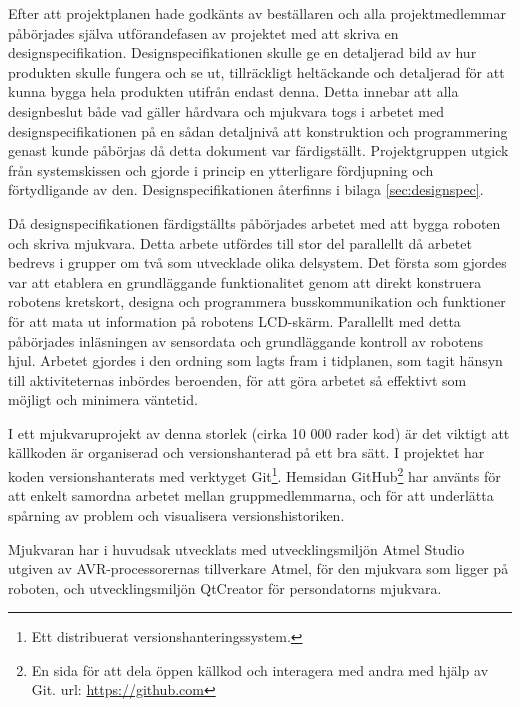 Efter att projektplanen hade godkänts av beställaren och alla projektmedlemmar påbörjades själva utförandefasen av projektet med att skriva en designspecifikation. Designspecifikationen skulle ge en detaljerad bild av hur produkten skulle fungera och se ut, tillräckligt heltäckande och detaljerad för att kunna bygga hela produkten utifrån endast denna. Detta innebar att alla designbeslut både vad gäller hårdvara och mjukvara togs i arbetet med designspecifikationen på en sådan detaljnivå att konstruktion och programmering genast kunde påbörjas då detta dokument var färdigställt. Projektgruppen utgick från systemskissen och gjorde i princip en ytterligare fördjupning och förtydligande av den. Designspecifikationen återfinns i bilaga \ref{sec:designspec}.

Då designspecifikationen färdigställts påbörjades arbetet med att bygga roboten och skriva mjukvara. Detta arbete utfördes till stor del parallellt då arbetet bedrevs i grupper om två som utvecklade olika delsystem. Det första som gjordes var att etablera en grundläggande funktionalitet genom att direkt konstruera robotens kretskort, designa och programmera busskommunikation och funktioner för att mata ut information på robotens LCD-skärm. Parallellt med detta påbörjades inläsningen av sensordata och grundläggande kontroll av robotens hjul. Arbetet gjordes i den ordning som lagts fram i tidplanen, som tagit hänsyn till aktiviteternas inbördes beroenden, för att göra arbetet så effektivt som möjligt och minimera väntetid. 

I ett mjukvaruprojekt av denna storlek (cirka 10 000 rader kod) är det viktigt att källkoden är organiserad och versionshanterad på ett bra sätt. I projektet har koden versionshanterats med verktyget Git\footnote{Ett distribuerat versionshanteringssystem.}. Hemsidan GitHub\footnote{En sida för att dela öppen källkod och interagera med andra med hjälp av Git. url: \url{https://github.com}} har använts för att enkelt samordna arbetet mellan gruppmedlemmarna, och för att underlätta spårning av problem och visualisera versionshistoriken.

Mjukvaran har i huvudsak utvecklats med utvecklingsmiljön Atmel Studio utgiven av AVR-processorernas tillverkare Atmel, för den mjukvara som ligger på roboten, och utvecklingsmiljön QtCreator för persondatorns mjukvara.